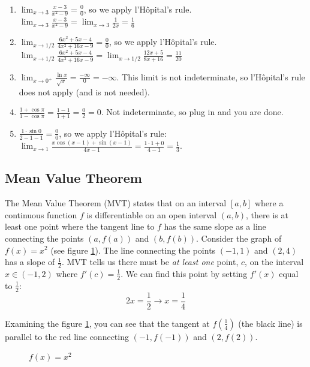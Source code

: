 \begin{Answer}[ref=LH2]
\begin{enumerate}
\item $\lim_{x \to 3} \frac{x-3}{x^2-9} = \frac{0}{0}$, so we apply l'H\^{o}pital's rule. $\lim_{x \to 3} \frac{x-3}{x^2-9} = \lim_{x \to 3} \frac{1}{2x} = \frac{1}{6}$
\item $\lim_{x \to 1/2} \frac{6x^2 + 5x - 4}{4x^2 + 16x - 9} = \frac{0}{0}$, so we apply l'H\^{o}pital's rule. $\lim_{x \to 1/2} \frac{6x^2 + 5x - 4}{4x^2 + 16x - 9} = \lim_{x \to 1/2} \frac{12x + 5}{8x + 16} = \frac{11}{20}$
\item $\lim_{x \to 0^+} \frac{\ln{x}}{\sqrt{x}} = \frac{-\infty}{0} = -\infty$. This limit is not indeterminate, so l'H\^{o}pital's rule does not apply (and is not needed).
\item $\frac{1 + \cos{\pi}}{1 - \cos{\pi}} = \frac{1 - 1}{1 + 1} = \frac{0}{2} = 0$. Not indeterminate, so plug in and you are done.
\item $\frac{1 \cdot \sin{0}}{2 - 1 - 1} = \frac{0}{0}$, so we apply l'H\^{o}pital's rule: $\lim_{x \to 1} \frac{x\cos{(x - 1)} + \sin{(x - 1)}}{4x - 1} = \frac{1 \cdot 1 + 0}{4 - 1} = \frac{1}{3}$.
\end{enumerate}
\end{Answer}

\subsection{Mean Value Theorem}

The Mean Value Theorem (MVT) states that on an interval $[a, b]$ where a 
continuous function $f$ is differentiable on an open interval $(a, b)$, there 
is at least one point where the tangent line to $f$ has the same slope as a 
line connecting the points $(a, f(a))$ and $(b, f(b))$. Consider the graph of 
$f(x) = x^2$ (see figure \ref{fig:MVT1}). The line connecting the points 
$(-1, 1)$ and $(2, 4)$ has a slope of $\frac{1}{2}$. MVT tells us there must 
be \textit{at least one} point, $c$, on the interval $x \in (-1, 2)$ where 
$f'(c) = \frac{1}{2}$. We can find this point by setting $f'(x)$ equal to 
$\frac{1}{2}$: 
$$2x = \frac{1}{2} \rightarrow x = \frac{1}{4}$$

Examining the figure \ref{fig:MVT1}, you can see that the tangent at 
$f(\frac{1}{4})$ (the black line) is parallel to the red line connecting 
$(-1, f(-1))$ and $(2, f(2))$. 

\begin{figure}[H]
\caption{$f(x) = x^2$}
\label{fig:MVT1}
\end{figure}

